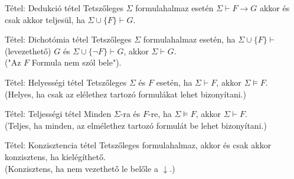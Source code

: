 \documentclass{beamer}
\begin{document}
\begin{frame}

\begin{block}{Tétel: Dedukció tétel}
Tetszőleges $\Sigma$ formulahalmaz esetén $\Sigma \vdash F \rightarrow G$ akkor és csak akkor teljesül, ha $\Sigma \cup \{F\} \vdash G$.

\end{block}

\begin{block}{Tétel: Dichotómia tétel}
Tetszőleges $\Sigma$ formulahalmaz esetén, ha $\Sigma \cup \{F\} \vdash$ (levezethető) $G$ és $\Sigma \cup \{\neg F\} \vdash G$, akkor $\Sigma \vdash G$.\\
("Az $F$ Formula nem szól bele").

\end{block}

\begin{block}{Tétel: Helyességi tétel}
Tetszőleges $\Sigma$ és $F$ esetén, ha $\Sigma \vdash F$, akkor $\Sigma \models F$.\\
(Helyes, ha csak az elélethez tartozó formulákat lehet bizonyítani.)

\end{block}

\begin{block}{Tétel: Teljességi tétel}
Minden $\Sigma$-ra és $F$-re, ha $\Sigma \models F$, akkor $\Sigma \vdash F$.\\
(Teljes, ha minden, az elmélethez tartozó formulát be lehet bizonyítani.)

\end{block}

\begin{block}{Tétel: Konzisztencia tétel}
Tetszőleges formulahalmaz, akkor és csak akkor konzisztens, ha kielégíthető.\\
(Konzisztens, ha nem vezethető le belőle a $\downarrow$.)

\end{block}

\end{frame}


\begin{frame}[plain]
\end{frame}
\end{document}
